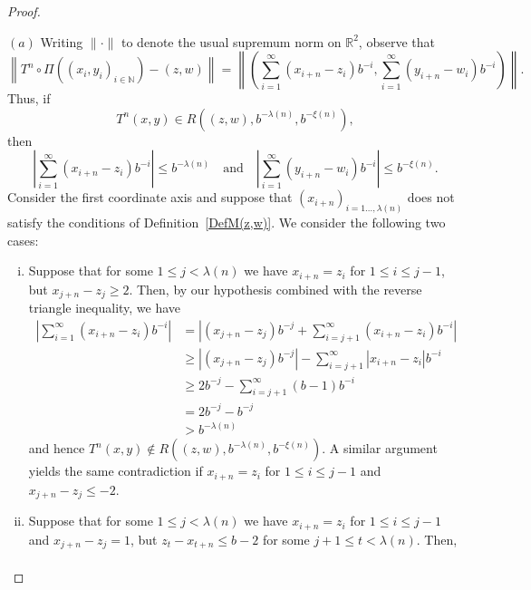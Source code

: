 \documentclass[12pt]{article}
\theoremstyle{remark}
\numberwithin{equation}{section}
\renewcommand{\Bbb}[1]{\mathbb{#1}}
\newcommand{\N}{{\Bbb N}}         %
\newcommand{\R}{{\Bbb R}}        %
\newcommand{\0}{\mathbf{0}}
\begin{document}
 \begin{proof} \,
 
\noindent $(a)$  Writing $\|\cdot\|$ to denote the usual supremum norm on $\R^{2}$, observe that
 \begin{equation*}
     \left\|T^{n} \circ \Pi\left((x_{i},y_{i})_{i \in \N}\right)-(z,w)\right\|=\left\|\left(\sum_{i=1}^{\infty}(x_{i+n}-z_{i})b^{-i}, \sum_{i=1}^{\infty}(y_{i+n}-w_{i})b^{-i} \right) \right\|.
 \end{equation*}
Thus, if 
 \begin{equation*}
     T^{n}(x,y) \in R\left((z,w), b^{-\lambda(n)}, b^{-\xi(n)} \right),
 \end{equation*}
 then
 \begin{equation*}
     \left|\sum_{i=1}^{\infty}(x_{i+n}-z_{i})b^{-i}\right| \leq b^{-\lambda(n)} \quad \text{and} \quad \left| \sum_{i=1}^{\infty}(y_{i+n}-w_{i})b^{-i} \right| \leq b^{-\xi(n)}.
 \end{equation*}
 Consider the first coordinate axis and suppose that $(x_{i+n})_{i=1 \dots , \lambda(n)}$ does not satisfy the conditions of Definition~\ref{DefM(z,w)}. We consider the following two cases:
\begin{enumerate}[(i)] 
  \item Suppose that for some $1 \leq j<\lambda(n)$ we have $x_{i+n}=z_{i}$ for $1 \leq i \leq j-1$, but $x_{j+n}-z_{j}\geq2$. Then, {by our hypothesis combined with the reverse triangle inequality, we have}
 \begin{align*}
     \left|\sum_{i=1}^{\infty}(x_{i+n}-z_{i})b^{-i}\right| &= \left| (x_{j+n}-z_{j})b^{-j}+ \sum_{i=j+1}^{\infty}(x_{i+n}-z_{i})b^{-i}\right| \\[1ex] 
     &{\geq \left|(x_{j+n}-z_j)b^{-j}\right| - \sum_{i=j+1}^{\infty}{\left|x_{i+n}-z_i\right|b^{-i}}} \\[1ex] 
     	&\geq 2b^{-j}-\sum_{i=j+1}^{\infty}{(b-1)b^{-i}} \\[1ex]
        &= 2b^{-j}-b^{-j} \\[1ex]
        &>b^{-\lambda(n)}
 \end{align*}
and hence $T^{n}(x,y) \not \in R\left((z,w), b^{-\lambda(n)}, b^{-\xi(n)} \right)$. {A similar argument yields the same contradiction} if $x_{i+n}=z_i$ for $1 \leq i \leq j-1$ and $x_{j+n}-z_{j}\leq-2$. 
 \item Suppose that for some $1 \leq j < \lambda(n)$ we have $x_{i+n}=z_{i}$ for $1 \leq i \leq j-1$ and $x_{j+n}-z_{j}=1$, but $z_{t}-x_{t+n}\leq b-2$ for some $j+1 \leq t < \lambda(n)$. Then,
 \begin{align*} 

\end{align*}
\end{enumerate}
\end{proof}
\end{document}
